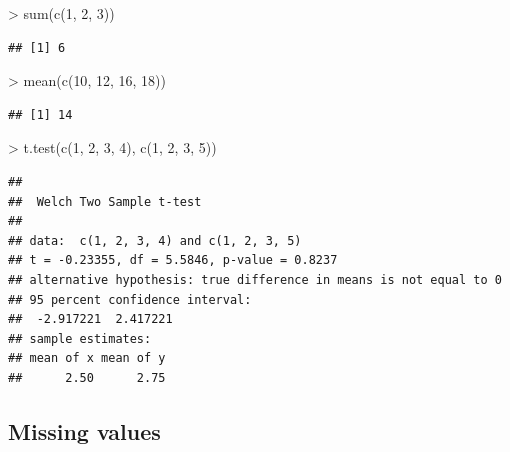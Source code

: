 \documentclass[
]{book}
\newenvironment{Shaded}{\begin{snugshade}}{\end{snugshade}}
\newcommand{\DecValTok}[1]{\textcolor[rgb]{0.00,0.00,0.81}{#1}}
\newcommand{\FunctionTok}[1]{\textcolor[rgb]{0.00,0.00,0.00}{#1}}
\newcommand{\NormalTok}[1]{#1}
\newcommand{\SpecialCharTok}[1]{\textcolor[rgb]{0.00,0.00,0.00}{#1}}
\begin{document}
\begin{Shaded}
\begin{Highlighting}[]
\SpecialCharTok{\textgreater{}} \FunctionTok{sum}\NormalTok{(}\FunctionTok{c}\NormalTok{(}\DecValTok{1}\NormalTok{, }\DecValTok{2}\NormalTok{, }\DecValTok{3}\NormalTok{))}
\end{Highlighting}
\end{Shaded}

\begin{verbatim}
## [1] 6
\end{verbatim}

\begin{Shaded}
\begin{Highlighting}[]
\SpecialCharTok{\textgreater{}} \FunctionTok{mean}\NormalTok{(}\FunctionTok{c}\NormalTok{(}\DecValTok{10}\NormalTok{, }\DecValTok{12}\NormalTok{, }\DecValTok{16}\NormalTok{, }\DecValTok{18}\NormalTok{))}
\end{Highlighting}
\end{Shaded}

\begin{verbatim}
## [1] 14
\end{verbatim}

\begin{Shaded}
\begin{Highlighting}[]
\SpecialCharTok{\textgreater{}} \FunctionTok{t.test}\NormalTok{(}\FunctionTok{c}\NormalTok{(}\DecValTok{1}\NormalTok{, }\DecValTok{2}\NormalTok{, }\DecValTok{3}\NormalTok{, }\DecValTok{4}\NormalTok{), }\FunctionTok{c}\NormalTok{(}\DecValTok{1}\NormalTok{, }\DecValTok{2}\NormalTok{, }\DecValTok{3}\NormalTok{, }\DecValTok{5}\NormalTok{))}
\end{Highlighting}
\end{Shaded}

\begin{verbatim}
## 
##  Welch Two Sample t-test
## 
## data:  c(1, 2, 3, 4) and c(1, 2, 3, 5)
## t = -0.23355, df = 5.5846, p-value = 0.8237
## alternative hypothesis: true difference in means is not equal to 0
## 95 percent confidence interval:
##  -2.917221  2.417221
## sample estimates:
## mean of x mean of y 
##      2.50      2.75
\end{verbatim}

\hypertarget{missing-values}{%
\subsection{Missing values}\label{missing-values}}
\end{document}
